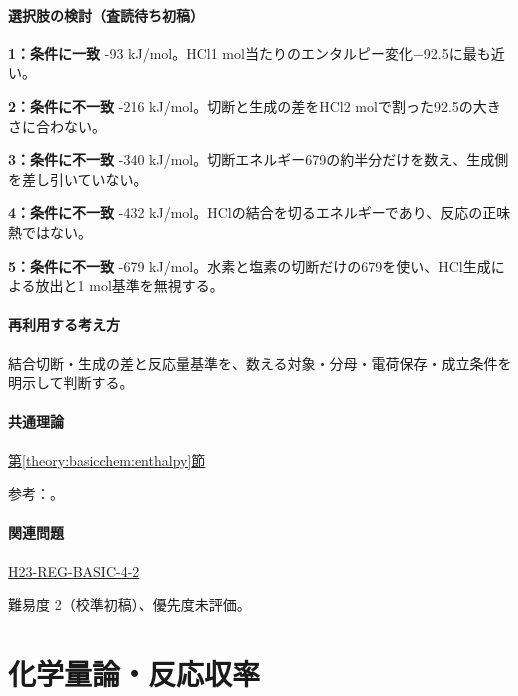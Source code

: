 \paragraph{選択肢の検討（査読待ち初稿）}\mbox{}\par

\noindent\textbf{1：条件に一致} -93 kJ/mol。HCl1 mol当たりのエンタルピー変化−92.5に最も近い。\par

\noindent\textbf{2：条件に不一致} -216 kJ/mol。切断と生成の差をHCl2 molで割った92.5の大きさに合わない。\par

\noindent\textbf{3：条件に不一致} -340 kJ/mol。切断エネルギー679の約半分だけを数え、生成側を差し引いていない。\par

\noindent\textbf{4：条件に不一致} -432 kJ/mol。HClの結合を切るエネルギーであり、反応の正味熱ではない。\par

\noindent\textbf{5：条件に不一致} -679 kJ/mol。水素と塩素の切断だけの679を使い、HCl生成による放出と1 mol基準を無視する。\par

\paragraph{再利用する考え方} 結合切断・生成の差と反応量基準を、数える対象・分母・電荷保存・成立条件を明示して判断する。

\paragraph{共通理論} \hyperref[theory:basicchem:enthalpy]{第\ref*{theory:basicchem:enthalpy}節}

\par 参考：\cite{mit_bond_enthalpy}。

\paragraph{関連問題} \hyperref[q:h23-reg-basic-4-2]{H23-REG-BASIC-4-2}

\par 難易度 2（校準初稿）、優先度未評価。

\section{化学量論・反応収率}

